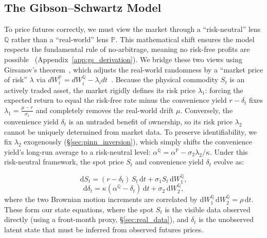 \documentclass[sigconf, authorversion=true, nonacm=true]{acmart}
\newcommand{\convyield}{\delta}             %
\newcommand{\meanrev}{\kappa}               %
\newcommand{\longrun}{\alpha}               %
\begin{document}
\subsection{The Gibson--Schwartz Model}
\label{sec:gs_model}
To price futures correctly, we must view the market through a ``risk-neutral'' lens $\mathbb{Q}$ rather than a ``real-world'' lens $\mathbb{P}$. This mathematical shift ensures the model respects the fundamental rule of no-arbitrage, meaning no risk-free profits are possible~\cite{girsanov1960transforming, harrison1981martingales, Schwartz1997TheHedging} (Appendix~\ref{app:gs_derivation}). We bridge these two views using Girsanov's theorem~\cite{girsanov1960transforming}, which adjusts the real-world randomness by a ``market price of risk'' $\lambda$ via $dW^{\mathbb{P}}_i = dW^{\mathbb{Q}}_i - \lambda_i dt$~\cite{Schwartz1997TheHedging}. Because the physical commodity $S_t$ is an actively traded asset, the market rigidly defines its risk price $\lambda_1$: forcing the expected return to equal the risk-free rate minus the convenience yield $r - \delta_t$ fixes $\lambda_1 = \frac{\mu - r}{\sigma_1}$ and completely removes the real-world drift $\mu$. Conversely, the convenience yield $\delta_t$ is an untraded benefit of ownership, so its risk price $\lambda_2$ cannot be uniquely determined from market data. To preserve identifiability, we fix $\lambda_2$ exogenously (\S\ref{sec:pinn_inversion}), which simply shifts the convenience yield's long-run average to a risk-neutral level: $\longrun^{\mathbb{Q}} = \longrun^{\mathbb{P}} -\sigma_2\lambda_2/\meanrev$. Under this risk-neutral framework, the spot price $S_t$ and convenience yield $\convyield_t$ evolve as:

\begin{equation}
  \label{eq:gs_spot}
  \mathrm{d}S_t = (r - \convyield_t)\,S_t\,\mathrm{d}t + \sigma_1 S_t\,\mathrm{d}W_1^{\mathbb{Q}},
\end{equation}
\begin{equation}
  \label{eq:gs_cy}
  \mathrm{d}\convyield_t = \meanrev(\longrun^{\mathbb{Q}} - \convyield_t)\,\mathrm{d}t + \sigma_2\,\mathrm{d}W_2^{\mathbb{Q}},
\end{equation}
\noindent
where the two Brownian motion increments are correlated by $\mathrm{d}W_1^{\mathbb{Q}}\,\mathrm{d}W_2^{\mathbb{Q}} = \rho\,\mathrm{d}t$. These form our state equations, where the spot $S_t$ is the visible data observed directly (using a front-month proxy, \S\ref{sec:real_data}), and $\convyield_t$ is the unobserved latent state that must be inferred from observed futures prices.
\end{document}
